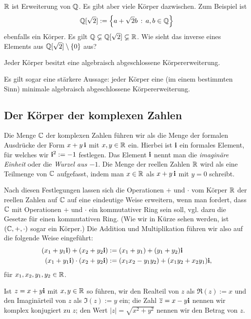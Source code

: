 \begin{bsp}
	$\mathbb{R}$ ist Erweiterung von $\mathbb{Q}$. Es gibt aber viele Körper dazwischen. Zum Beispiel ist 
	\[
		\mathbb{Q}[\sqrt{2}] := \left\{  a + \sqrt{2} b  \,:\, a,b \in \mathbb{Q} \right\}
	\]
	ebenfalls ein Körper. Es gilt $\mathbb{Q} \varsubsetneq \mathbb{Q}[\sqrt{2}] \varsubsetneq \mathbb{R}$. 
	Wie sieht das inverse eines Elements aus $\mathbb{Q}[\sqrt{2} ] \setminus \{0\}$ aus? 
\end{bsp} 

\begin{thm}
	Jeder Körper besitzt eine algebraisch abgeschlossene Körpererweiterung. 	
\end{thm} 

\begin{bem}
	Es gilt sogar eine stärkere Aussage: jeder Körper eine (im einem bestimmten Sinn) minimale algebraisch abgeschlossene Körpererweiterung. 
\end{bem} 

\subsection{Der Körper der komplexen Zahlen} 

\begin{defn} 
	Die Menge $\mathbb{C}$ der komplexen Zahlen führen wir als die Menge der formalen Ausdrücke der Form $x +  y \, \mathbf{i}$ mit $x, y \in \mathbb{R}$ ein. Hierbei ist $\mathbf{i}$ ein formales Element, für welches wir $\mathbf{i}^2 := -1$ festlegen. Das Element $\mathbf{i}$ nennt man die \emph{imaginäre Einheit} oder die \emph{Wurzel aus $-1$}. Die Menge der reellen Zahlen $\mathbb{R}$ wird als eine Teilmenge von $\mathbb{C}$ aufgefasst, indem man $x \in \mathbb{R}$ als $x +  y  \, \mathbf{i}$ mit $y=0$ schreibt. 
	
	Nach diesen Festlegungen lassen sich die Operationen $+$ und $\cdot$ vom Körper $\mathbb{R}$ der reellen Zahlen auf $\mathbb{C}$ auf eine eindeutige Weise erweitern, wenn man fordert, dass  $\mathbb{C}$ mit Operationen $+$ und $\cdot$ ein kommutativer Ring sein soll, vgl. dazu die Gesetze für einen kommutativen Ring.  (Wie wir in Kürze sehen werden, ist $(\mathbb{C},+,\cdot)$ sogar ein Körper.) Die Addition und Multiplikation führen wir also auf die folgende Weise eingeführt: 
	\begin{align*}
			(x_1 + y_1 \mathbf{i} ) + (x_2 +  y_2 \mathbf{i} ) & := (x_1 +y_1) +  (y_1 + y_2) \mathbf{i}
			\\ (x_1 + y_1 \mathbf{i}) \cdot (x_2 + y_2 \mathbf{i}) & := (x_1 x_2 - y_1 y_2) + (x_1 y_2 + x_2 y_1) \mathbf{i},
	\end{align*} 
für $x_1,x_2, y_1, y_2 \in \mathbb{R}$. 

Ist $z = x  + y \mathbf{i}$ mit $x, y \in \mathbb{R}$ so führen, wir den Realteil von $z$ als $\Re(z) :=x$ und den Imaginärteil von $z$ als $\Im(z):= y$ ein; die Zahl $\overline{z} = x - y \mathbf{i}$ nennen wir komplex konjugiert zu $z$; den Wert $|z| = \sqrt{x^2 + y^2}$ nennen wir den Betrag von $z$. 
\end{defn} 

